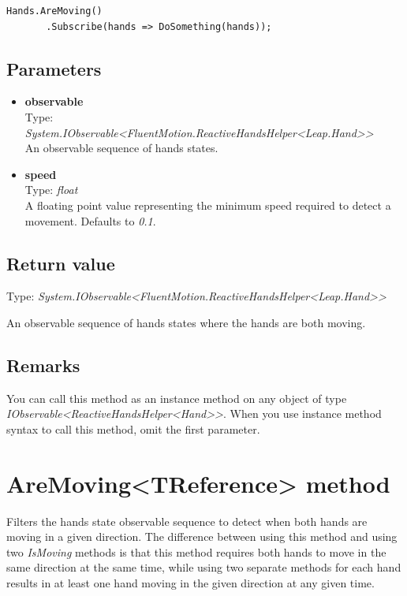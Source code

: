\documentclass[12pt,a4paper,twoside]{report}
\begin{document}
\begin{lstlisting}[caption=Usage example]
  Hands.AreMoving()
       .Subscribe(hands => DoSomething(hands));
\end{lstlisting}

\subsection{Parameters}
\begin{itemize}
  \item \textbf{observable}\\
    Type: \textit{System.IObservable<FluentMotion.ReactiveHandsHelper<Leap.Hand>{}>}\\
    An observable sequence of hands states.
  \item \textbf{speed}\\
    Type: \textit{float}\\
    A floating point value representing the minimum speed required to detect a movement. Defaults to \textit{0.1}.
\end{itemize}

\subsection{Return value}
Type: \textit{System.IObservable<FluentMotion.ReactiveHandsHelper<Leap.Hand>{}>}

An observable sequence of hands states where the hands are both moving.

\subsection{Remarks}
You can call this method as an instance method on any object of type \textit{IObservable<ReactiveHandsHelper<Hand>{}>}. When you use instance method syntax to call this method, omit the first parameter.

\section{AreMoving<TReference> method}
Filters the hands state observable sequence to detect when both hands are moving in a given direction. The difference between using this method and using two \textit{IsMoving} methods is that this method requires both hands to move in the same direction at the same time, while using two separate methods for each hand results in at least one hand moving in the given direction at any given time.
\end{document}
